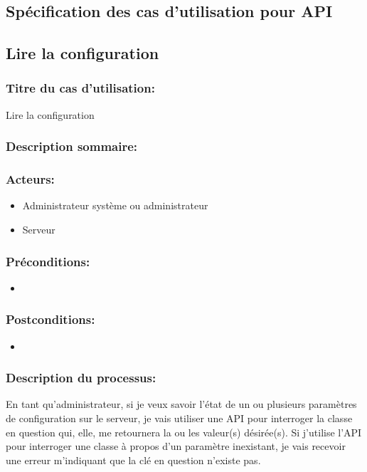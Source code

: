 \documentclass{scrreprt}
\begin{document}
\begin{itemizen}
\section{Spécification des cas d'utilisation pour API}
\subsection{Lire la configuration}
\subsubsection{Titre du cas d'utilisation:} Lire la configuration
\subsubsection{Description sommaire:}
\subsubsection{Acteurs:}
\begin{itemize}
	\item Administrateur système ou administrateur
    \item Serveur
\end{itemize}
\subsubsection{Préconditions:}
\begin{itemize}
    \item  
\end{itemize} 
\subsubsection{Postconditions:}
\begin{itemize}
    \item  
\end{itemize} 
\subsubsection{Description du processus:}En tant qu'administrateur, si je veux savoir l'état de un ou plusieurs paramètres de
configuration sur le serveur, je vais utiliser une API pour interroger la
classe en question qui, elle, me retournera la ou les valeur(s) désirée(s).
Si j'utilise l'API pour interroger une classe à propos d'un paramètre
inexistant, je vais recevoir une erreur m'indiquant que la clé en question
n'existe pas.


\end{itemizen}
\end{document}
